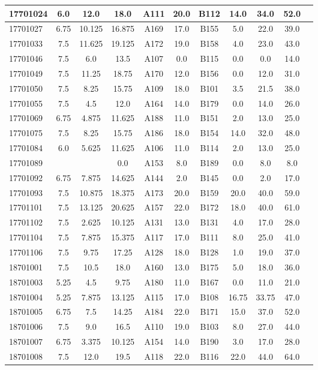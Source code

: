 \documentclass[12pt]{article}
\begin{document}
\begin{center}
\begin{small}
\begin{tabular}{|l|c|c|c|c|c|c|c|c|c|c|}
17701024 & 6.0 & 12.0 & 18.0 & A111 & 20.0 & B112 & 14.0 & 34.0 & 52.0\\ \hline 
17701027 & 6.75 & 10.125 & 16.875 & A169 & 17.0 & B155 & 5.0 & 22.0 & 39.0\\ \hline 
17701033 & 7.5 & 11.625 & 19.125 & A172 & 19.0 & B158 & 4.0 & 23.0 & 43.0\\ \hline 
17701046 & 7.5 & 6.0 & 13.5 & A107 & 0.0 & B115 & 0.0 & 0.0 & 14.0\\ \hline 
17701049 & 7.5 & 11.25 & 18.75 & A170 & 12.0 & B156 & 0.0 & 12.0 & 31.0\\ \hline 
17701050 & 7.5 & 8.25 & 15.75 & A109 & 18.0 & B101 & 3.5 & 21.5 & 38.0\\ \hline 
17701055 & 7.5 & 4.5 & 12.0 & A164 & 14.0 & B179 & 0.0 & 14.0 & 26.0\\ \hline 
17701069 & 6.75 & 4.875 & 11.625 & A188 & 11.0 & B151 & 2.0 & 13.0 & 25.0\\ \hline 
17701075 & 7.5 & 8.25 & 15.75 & A186 & 18.0 & B154 & 14.0 & 32.0 & 48.0\\ \hline 
17701084 & 6.0 & 5.625 & 11.625 & A106 & 11.0 & B114 & 2.0 & 13.0 & 25.0\\ \hline 
17701089 &  &  & 0.0 & A153 & 8.0 & B189 & 0.0 & 8.0 & 8.0\\ \hline 
17701092 & 6.75 & 7.875 & 14.625 & A144 & 2.0 & B145 & 0.0 & 2.0 & 17.0\\ \hline 
17701093 & 7.5 & 10.875 & 18.375 & A173 & 20.0 & B159 & 20.0 & 40.0 & 59.0\\ \hline 
17701101 & 7.5 & 13.125 & 20.625 & A157 & 22.0 & B172 & 18.0 & 40.0 & 61.0\\ \hline 
17701102 & 7.5 & 2.625 & 10.125 & A131 & 13.0 & B131 & 4.0 & 17.0 & 28.0\\ \hline 
17701104 & 7.5 & 7.875 & 15.375 & A117 & 17.0 & B111 & 8.0 & 25.0 & 41.0\\ \hline 
17701106 & 7.5 & 9.75 & 17.25 & A128 & 18.0 & B128 & 1.0 & 19.0 & 37.0\\ \hline 
18701001 & 7.5 & 10.5 & 18.0 & A160 & 13.0 & B175 & 5.0 & 18.0 & 36.0\\ \hline 
18701003 & 5.25 & 4.5 & 9.75 & A180 & 11.0 & B167 & 0.0 & 11.0 & 21.0\\ \hline 
18701004 & 5.25 & 7.875 & 13.125 & A115 & 17.0 & B108 & 16.75 & 33.75 & 47.0\\ \hline 
18701005 & 6.75 & 7.5 & 14.25 & A184 & 22.0 & B171 & 15.0 & 37.0 & 52.0\\ \hline 
18701006 & 7.5 & 9.0 & 16.5 & A110 & 19.0 & B103 & 8.0 & 27.0 & 44.0\\ \hline 
18701007 & 6.75 & 3.375 & 10.125 & A154 & 14.0 & B190 & 3.0 & 17.0 & 28.0\\ \hline 
18701008 & 7.5 & 12.0 & 19.5 & A118 & 22.0 & B116 & 22.0 & 44.0 & 64.0\\ \hline 
        \end{tabular}
            \end{small}
            \end{center}
  \centering
            
\end{document}

